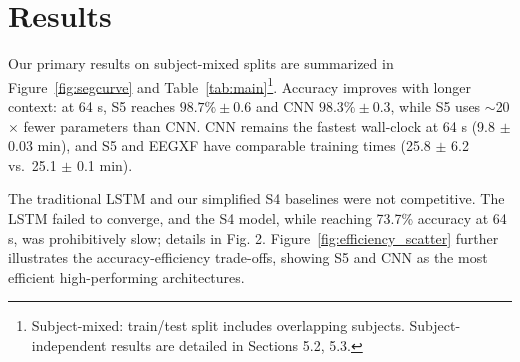 \documentclass{article}
\newcommand{\eegtrans}{EEGXF}
\begin{document}




\section{Results}
\label{sec:results}
Our primary results on subject-mixed splits are summarized in Figure~\ref{fig:segcurve} and Table~\ref{tab:main}\footnote{Subject-mixed: train/test split includes overlapping subjects. Subject-independent results are detailed in Sections 5.2, 5.3.}. 
Accuracy improves with longer context: at 64 s, S5 reaches $98.7\%\pm0.6$ and CNN $98.3\%\pm0.3$, 
while S5 uses $\sim$20$\times$ fewer parameters than CNN. 
CNN remains the fastest wall-clock at 64 s (9.8 $\pm$ 0.03 min), and S5 and \eegtrans{} have comparable training times (25.8 $\pm$ 6.2 vs.\ 25.1 $\pm$ 0.1 min). 


The traditional LSTM and our simplified S4 baselines were not competitive. The LSTM failed to converge, and the S4 model, while reaching 73.7\% accuracy at 64 s, was prohibitively slow; details in Fig. 2.
Figure~\ref{fig:efficiency_scatter} further illustrates the accuracy-efficiency trade-offs, showing S5 and CNN as the most efficient high-performing architectures.
\end{document}
